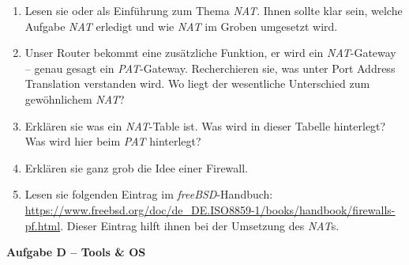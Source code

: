 \documentclass[paper=a4,fontsize=11pt]{scrartcl}%
\numberwithin{equation}{section}
\begin{document}
\begin{enumerate}
	\item Lesen sie \cite[S. 349ff]{Kurose2012} oder \cite{fall2011tcp} als Einführung zum Thema \emph{NAT}. Ihnen sollte klar sein, welche Aufgabe \emph{NAT} erledigt und wie \emph{NAT} im Groben umgesetzt wird.
	\item Unser Router bekommt eine zusätzliche Funktion, er wird ein \emph{NAT}-Gateway -- genau gesagt ein \emph{PAT}-Gateway. Recherchieren sie, was unter Port Address Translation verstanden wird. Wo liegt der wesentliche Unterschied zum gewöhnlichem \emph{NAT}?
	\item Erklären sie was ein \emph{NAT}-Table ist. Was wird in dieser Tabelle hinterlegt? Was wird hier beim \emph{PAT} hinterlegt?
	\item Erklären sie ganz grob die Idee einer Firewall.
	\item Lesen sie folgenden Eintrag im \emph{freeBSD}-Handbuch: \url{https://www.freebsd.org/doc/de_DE.ISO8859-1/books/handbook/firewalls-pf.html}. Dieser Eintrag hilft ihnen bei der Umsetzung des \emph{NAT}s.
\end{enumerate}


\begin{center}
\Large{\textbf{Aufgabe D -- Tools \& OS}}
\end{center}
\vskip0.25in
\end{document}
